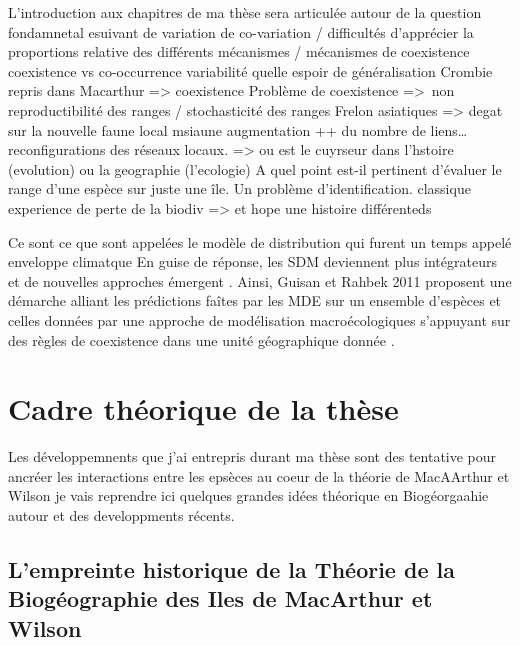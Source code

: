 L'introduction aux chapitres de ma thèse sera articulée autour de la
question fondamnetal esuivant de variation de co-variation / difficultés
d'apprécier la proportions relative des différents mécanismes /
mécanismes de coexistence coexistence vs co-occurrence variabilité
quelle espoir de généralisation Crombie repris dans Macarthur
=\textgreater{} coexistence Problème de coexistence =\textgreater{}~non
reproductibilité des ranges / stochasticité des ranges Frelon asiatiques
=\textgreater{} degat sur la nouvelle faune local msiaune augmentation
++ du nombre de liens\ldots{} reconfigurations des réseaux locaux.
=\textgreater{} ou est le cuyrseur dans l'hstoire (evolution) ou la
geographie (l'ecologie) A quel point est-il pertinent d'évaluer le range
d'une espèce sur juste une île. Un problème d'identification. classique
experience de perte de la biodiv =\textgreater{} et hope une histoire
différenteds

Ce sont ce que sont appelées le modèle de distribution qui furent un
temps appelé enveloppe climatque En guise de réponse, les SDM deviennent
plus intégrateurs et de nouvelles approches émergent
\cite{Kissling2011}. Ainsi, Guisan et Rahbek 2011 proposent une démarche
alliant les prédictions faîtes par les MDE sur un ensemble d'espèces et
celles données par une approche de modélisation macroécologiques
s'appuyant sur des règles de coexistence dans une unité géographique
donnée \cite{Guisan2011}.

\section*{Cadre théorique de la
thèse}\label{cadre-thuxe9orique-de-la-thuxe8se}

Les développemnents que j'ai entrepris durant ma thèse sont des
tentative pour ancréer les interactions entre les epsèces au coeur de la
théorie de MacAArthur et Wilson je vais reprendre ici quelques grandes
idées théorique en Biogéorgaahie autour et des developpments récents.

\subsection*{L'empreinte historique de la Théorie de la Biogéographie
des Iles de MacArthur et
Wilson}\label{lempreinte-historique-de-la-thuxe9orie-de-la-bioguxe9ographie-des-iles-de-macarthur-et-wilson}


